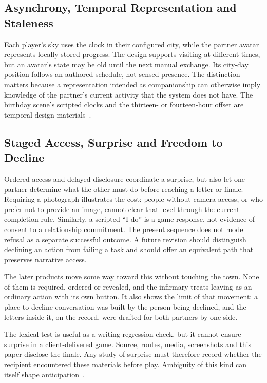 \documentclass[sigconf,nonacm]{acmart}
\begin{document}
\subsection{Asynchrony, Temporal Representation and Staleness}
Each player's sky uses the clock in their configured city, while the partner avatar represents
locally stored progress. The design supports visiting at different times, but an avatar's state
may be old until the next manual exchange. Its city-day position follows an authored schedule,
not sensed presence. The distinction matters because a representation intended as companionship
can otherwise imply knowledge of the partner's current activity that the system does not have.
The birthday scene's scripted clocks and the thirteen- or fourteen-hour offset are temporal
design materials~\cite{hallnas2001slow,odom2012technology}.

\subsection{Staged Access, Surprise and Freedom to Decline}
Ordered access and delayed disclosure coordinate a surprise, but also let one partner determine
what the other must do before reaching a letter or finale. Requiring a photograph illustrates the
cost: people without camera access, or who prefer not to provide an image, cannot clear that level
through the current completion rule. Similarly, a scripted ``I do'' is a game response, not evidence
of consent to a relationship commitment. The present sequence does not model refusal as a separate
successful outcome. A future revision should distinguish declining an action from failing a task
and should offer an equivalent path that preserves narrative access.

The later products move some way toward this without touching the town. None of them is
required, ordered or revealed, and the infirmary treats leaving as an ordinary action with its
own button. It also shows the limit of that movement: a place to decline conversation was built
by the person being declined, and the letters inside it, on the record, were drafted for both
partners by one side.

The lexical test is useful as a writing regression check, but it cannot ensure surprise in a
client-delivered game. Source, routes, media, screenshots and this paper disclose the finale.
Any study of surprise must therefore record whether the recipient encountered these materials
before play. Ambiguity of this kind can itself shape anticipation~\cite{gaver2003ambiguity}.
\end{document}
